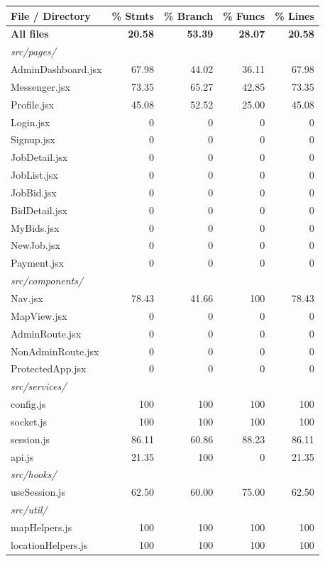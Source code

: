 \documentclass[11pt]{article}
\begin{document}
\begin{center}
\small
\begin{longtable}{@{}p{4.6cm} r r r r@{}}
\toprule
\textbf{File / Directory} & \textbf{\% Stmts} & \textbf{\% Branch} & \textbf{\% Funcs} & \textbf{\% Lines} \\
\midrule
\endhead
\textbf{All files} & \textbf{20.58} & \textbf{53.39} & \textbf{28.07} & \textbf{20.58} \\
\midrule
\multicolumn{5}{l}{\textit{src/pages/}} \\
\quad AdminDashboard.jsx & 67.98 & 44.02 & 36.11 & 67.98 \\
\quad Messenger.jsx & 73.35 & 65.27 & 42.85 & 73.35 \\
\quad Profile.jsx & 45.08 & 52.52 & 25.00 & 45.08 \\
\quad Login.jsx & 0 & 0 & 0 & 0 \\
\quad Signup.jsx & 0 & 0 & 0 & 0 \\
\quad JobDetail.jsx & 0 & 0 & 0 & 0 \\
\quad JobList.jsx & 0 & 0 & 0 & 0 \\
\quad JobBid.jsx & 0 & 0 & 0 & 0 \\
\quad BidDetail.jsx & 0 & 0 & 0 & 0 \\
\quad MyBids.jsx & 0 & 0 & 0 & 0 \\
\quad NewJob.jsx & 0 & 0 & 0 & 0 \\
\quad Payment.jsx & 0 & 0 & 0 & 0 \\
\midrule
\multicolumn{5}{l}{\textit{src/components/}} \\
\quad Nav.jsx & 78.43 & 41.66 & 100 & 78.43 \\
\quad MapView.jsx & 0 & 0 & 0 & 0 \\
\quad AdminRoute.jsx & 0 & 0 & 0 & 0 \\
\quad NonAdminRoute.jsx & 0 & 0 & 0 & 0 \\
\quad ProtectedApp.jsx & 0 & 0 & 0 & 0 \\
\midrule
\multicolumn{5}{l}{\textit{src/services/}} \\
\quad config.js & 100 & 100 & 100 & 100 \\
\quad socket.js & 100 & 100 & 100 & 100 \\
\quad session.js & 86.11 & 60.86 & 88.23 & 86.11 \\
\quad api.js & 21.35 & 100 & 0 & 21.35 \\
\midrule
\multicolumn{5}{l}{\textit{src/hooks/}} \\
\quad useSession.js & 62.50 & 60.00 & 75.00 & 62.50 \\
\midrule
\multicolumn{5}{l}{\textit{src/util/}} \\
\quad mapHelpers.js & 100 & 100 & 100 & 100 \\
\quad locationHelpers.js & 100 & 100 & 100 & 100 \\
\bottomrule
\end{longtable}
\end{center}
\end{document}
